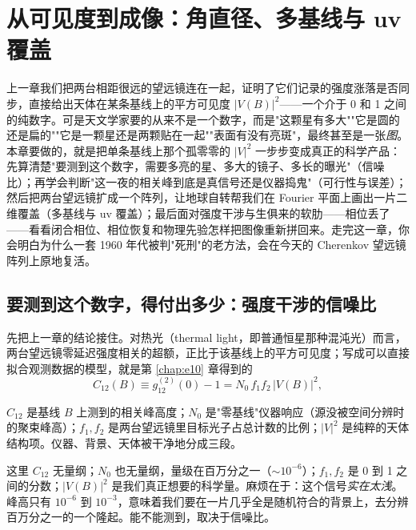 \chapter{从可见度到成像：角直径、多基线与 uv 覆盖}
\label{chap:e11}

\begin{chapteropening}
上一章我们把两台相距很远的望远镜连在一起，证明了它们记录的强度涨落是否同步，直接给出天体在某条基线上的平方可见度 \(|V(B)|^2\)——一个介于 0 和 1 之间的纯数字。可是天文学家要的从来不是一个数字，而是"这颗星有多大""它是圆的还是扁的""它是一颗星还是两颗贴在一起""表面有没有亮斑"，最终甚至是一张\emph{图}。本章要做的，就是把单条基线上那个孤零零的 \(|V|^2\) 一步步变成真正的科学产品：先算清楚"要测到这个数字，需要多亮的星、多大的镜子、多长的曝光"（信噪比）；再学会判断"这一夜的相关峰到底是真信号还是仪器捣鬼"（可行性与误差）；然后把两台望远镜扩成一个阵列，让地球自转帮我们在 Fourier 平面上画出一片二维覆盖（多基线与 uv 覆盖）；最后面对强度干涉与生俱来的软肋——相位丢了——看看闭合相位、相位恢复和物理先验怎样把图像重新拼回来。走完这一章，你会明白为什么一套 1960 年代被判"死刑"的老方法，会在今天的 Cherenkov 望远镜阵列上原地复活。
\end{chapteropening}

\section{要测到这个数字，得付出多少：强度干涉的信噪比}
\label{sec:e11-snr}

先把上一章的结论接住。对热光（thermal light，即普通恒星那种混沌光）而言，两台望远镜零延迟强度相关的超额，正比于该基线上的平方可见度；写成可以直接拟合观测数据的模型，就是第 \ref{chap:e10} 章得到的
\begin{equation}
  C_{12}(B)\equiv g_{12}^{(2)}(0)-1 = N_0\,f_1 f_2\,\big|V(B)\big|^2 ,
  \label{eq:e11-correlation-model}
\end{equation}
\begin{formulaexplain}
\(C_{12}\) 是基线 \(B\) 上测到的相关峰高度；\(N_0\) 是"零基线"仪器响应（源没被空间分辨时的聚束峰高）；\(f_1,f_2\) 是两台望远镜里目标光子占总计数的比例；\(|V|^2\) 是纯粹的天体结构项。仪器、背景、天体被干净地分成三段。
\end{formulaexplain}
这里 \(C_{12}\) 无量纲；\(N_0\) 也无量纲，量级在百万分之一（\(\sim10^{-6}\)）；\(f_1,f_2\) 是 0 到 1 之间的分数；\(|V(B)|^2\) 是我们真正想要的科学量。麻烦在于：这个信号\emph{实在太浅}。峰高只有 \(10^{-6}\) 到 \(10^{-3}\)，意味着我们要在一片几乎全是随机符合的背景上，去分辨百万分之一的一个隆起。能不能测到，取决于信噪比。

